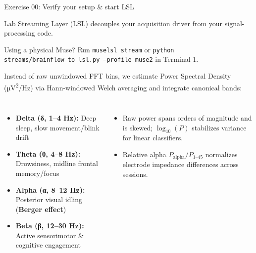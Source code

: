 \documentclass[aspectratio=169,11pt,t]{beamer}
\begin{document}

\begin{frame}{Exercise 00: Verify your setup \& start LSL}
  {\NTXSans\small\color{NTXMuted}Lab Streaming Layer (LSL) decouples your acquisition driver from your signal-processing code.\par}
  \vspace{2mm}
  {\NTXSans\scriptsize\color{NTXMuted}Using a physical Muse? Run \texttt{muselsl stream} or \texttt{python streams/brainflow\_to\_lsl.py --profile muse2} in Terminal 1.\par}
\end{frame}

\begin{NTXSandFrame}
  {\NTXSans\small\color{NTXMuted}Instead of raw unwindowed FFT bins, we estimate Power Spectral Density (µV\textsuperscript{2}/Hz) via Hann-windowed Welch averaging and integrate canonical bands:\par}
  \vspace{3mm}
  \begin{columns}[T,onlytextwidth]
      \begin{itemize}\scriptsize\color{NTXInk}
        \item \textbf{Delta (δ, 1--4 Hz):} Deep sleep, slow movement/blink drift
        \item \textbf{Theta (θ, 4--8 Hz):} Drowsiness, midline frontal memory/focus
        \item \textbf{Alpha (α, 8--12 Hz):} Posterior visual idling (\textbf{Berger effect})
        \item \textbf{Beta (β, 12--30 Hz):} Active sensorimotor \& cognitive engagement
      \end{itemize}
      \begin{itemize}\scriptsize\color{NTXInk}
        \item Raw power spans orders of magnitude and is skewed; $\log_{10}(P)$ stabilizes variance for linear classifiers.
        \item Relative alpha $P_{\mathrm{alpha}} / P_{1\text{--}45}$ normalizes electrode impedance differences across sessions.
      \end{itemize}
  \end{columns}
\end{NTXSandFrame}
\end{document}
